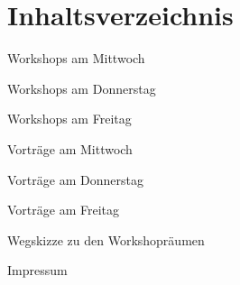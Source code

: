 \section*{Inhaltsverzeichnis}


\vspace*{0.35em}%
\noindent Workshops am Mittwoch \dotfill \pageref{mittwoch-workshops}

\vspace*{0.35em}%
\noindent Workshops am Donnerstag \dotfill \pageref{donnerstag-workshops}

\vspace*{0.35em}%
\noindent Workshops am Freitag \dotfill \pageref{freitag-workshops}

\vspace*{0.35em}%
\noindent Vorträge am Mittwoch \dotfill \pageref{mittwoch}

\vspace*{0.35em}%
\noindent Vorträge am Donnerstag \dotfill \pageref{donnerstag}

\vspace*{0.35em}%
\noindent Vorträge am Freitag \dotfill \pageref{freitag}

\vspace*{0.35em}%
\noindent Wegskizze zu den Workshopräumen \dotfill \pageref{karte}

\vspace*{0.35em}%
\noindent Impressum \dotfill \pageref{impressum}\\

%

